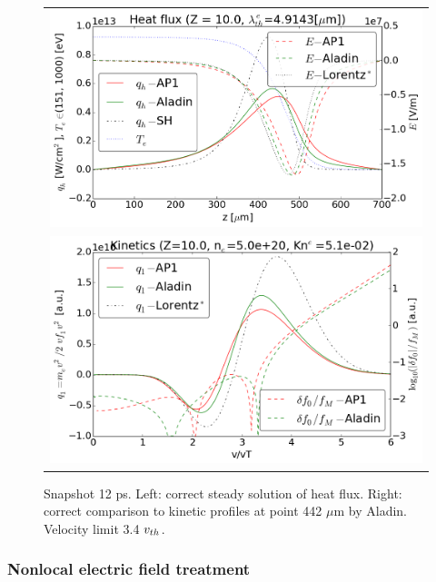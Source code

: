 \begin{figure}[tbh]
  \begin{center}
    \begin{tabular}{c}
      \includegraphics[width=\figscale\textwidth]{../VFPdata/C7_Aladin_case3_heatflux.png} \\
      \includegraphics[width=\figscale\textwidth]{../VFPdata/C7_Aladin_case3_kinetics.png}
    \end{tabular}
  \caption{  
  Snapshot 12 ps. Left: correct steady solution of heat flux. 
  Right: correct comparison to kinetic profiles at point 442 $\mu$m by Aladin. 
  Velocity limit 3.4 $v_{th}$.
  }
  \label{fig:C7_Aladin_case3}
  \end{center} 
\end{figure}


\subsubsection{Nonlocal electric field treatment}
\label{sec:Efield}

